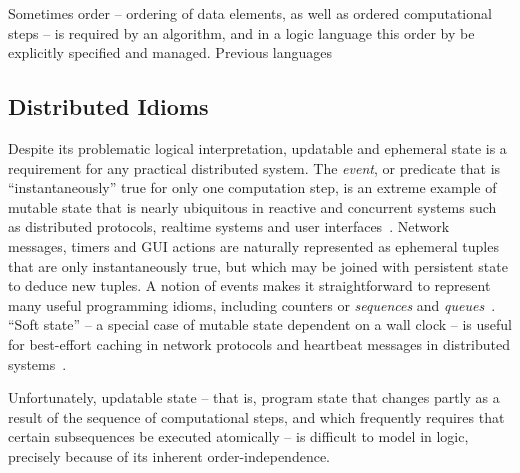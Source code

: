 Sometimes order -- ordering of data elements, as well as ordered computational steps -- 
is required by an algorithm, and in a logic language this order by be explicitly specified and 
managed.  Previous languages 


\subsection{Distributed Idioms}

Despite its problematic logical interpretation, updatable and ephemeral state is a requirement
for any practical distributed system.  The \emph{event}, or predicate that is ``instantaneously''
true for only one computation step, is an extreme example of mutable state that is nearly
ubiquitous in reactive and concurrent systems such as distributed protocols, realtime systems
and user interfaces~\cite{prologevents}.
Network messages, timers and GUI actions are
naturally represented as ephemeral tuples that are only instantaneously true, 
but which may be joined with persistent state to deduce new
tuples.  A notion of events makes it straightforward to represent many useful
programming idioms, including counters or \emph{sequences} and
\emph{queues}~\cite{netdb}.
``Soft state'' -- a special case of mutable state dependent on a wall clock -- 
is  useful for best-effort
caching in network protocols and heartbeat messages in distributed
systems~\cite{boom-techr}.  

Unfortunately, updatable state -- that is, program state that changes partly as a result of the 
sequence of computational steps, and which frequently requires that certain subsequences be executed atomically -- is difficult to model in logic, precisely because of its inherent order-independence.  


